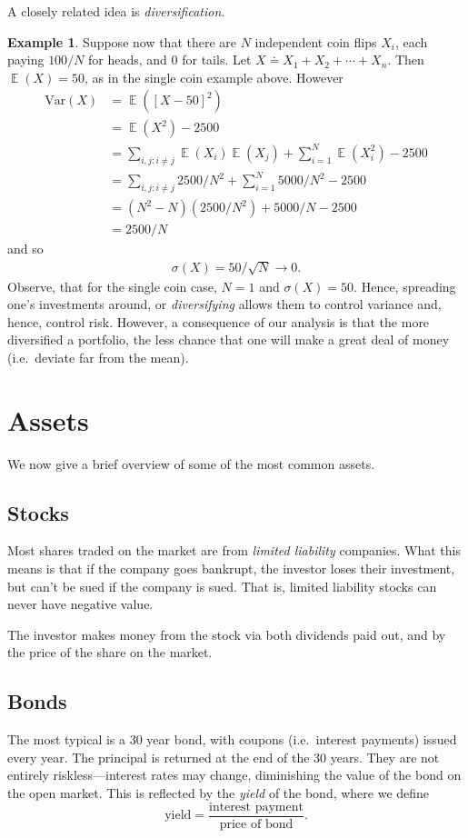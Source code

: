 \documentclass[12pt]{amsbook}
\DeclareMathOperator{\ex}{\mathbb{E}}
\newcommand{\var}{\mathrm{Var}}
\theoremstyle{plain}
\theoremstyle{definition}
\newtheorem*{example}{Example}
\theoremstyle{remark}
\numberwithin{equation}{section}  %
\begin{document}
	A closely related idea is \emph{diversification}. 
	\begin{example}
		Suppose now that there are $N$ independent coin flips $X_i$, each paying 
		$100/N$ for heads, and $0$ for tails. Let $X \doteq X_1 + X_2 + \cdots + 
		X_n$. Then $\ex(X) = 50$, as in the single coin example above. However
		\begin{align*}
			\var(X)
			& = \ex({[X - 50]}^2)
			\\
			& = \ex(X^2) - 2500
			\\
			& = \sum_{i,j: i \neq j} \ex(X_i)\ex(X_j) + \sum_{i=1}^N \ex(X_i^2) - 2500 
			\\
			& = \sum_{i,j: i \neq j} 2500/N^2 + \sum_{i=1}^{N} 5000/N^2 - 2500
			\\
			& = (N^{2} - N)(2500/N^2) + 5000/N - 2500
			\\
			& = 2500/N 
		\end{align*}
		and so
		\begin{align*}
			\sigma(X) = 50/\sqrt{N} \to 0.
		\end{align*}
		Observe, that for the single coin case, $N = 1$ and $\sigma(X) = 50$.
		Hence, spreading one's investments around, or \emph{diversifying} allows 
		them to
		control variance and, hence, control risk. However, a consequence of our 
		analysis is that the more diversified a portfolio, the less chance that one 
		will make a great deal of money (i.e.\ deviate far from the mean).  
	\end{example}
	\section{Assets}
	We now give a brief overview of some of the most common assets.

	\subsection*{Stocks}
	Most shares traded on the market are from \emph{limited liability} companies.
	What this means is that if the company goes bankrupt, the investor loses their 
	investment, but can't be sued if the company is sued. That is, limited
	liability stocks can never have negative value.

	The investor makes money 
	from the stock via both dividends paid out, and by the price of the share on 
	the market.

	\subsection*{Bonds} 
	The most typical is a $30$ year bond, with coupons (i.e.\ interest payments) 
	issued every year. The principal is returned at the end of the $30$ years.
	They are  not entirely riskless---interest rates may change, diminishing the 
	value of the bond on the open market. This is reflected by the \emph{yield} of 
	the bond, where we define
	\begin{equation*}
		\text{yield} = \frac{\text{interest payment}}{\text{price of bond}}.
	\end{equation*}
	
\end{document}
